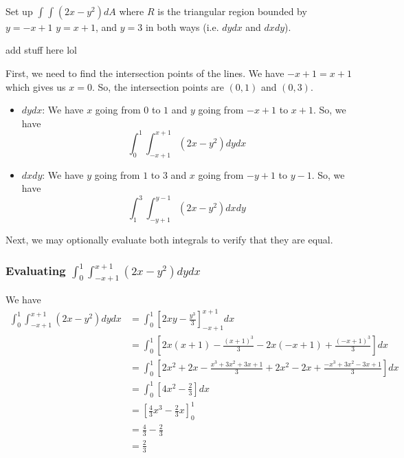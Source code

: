\documentclass{article}
\begin{document}
\begin{examplebox}
    Set up \( \int_{}^{} \int_{}^{} (2x - y^2) dA \) where \( R \) is the triangular region bounded by \( y = -x + 1 \) \( y = x + 1 \), and \( y = 3 \) in both ways (i.e. \( dydx \) and \( dxdy \)).
    \begin{illustrationbox}
        add stuff here lol
    \end{illustrationbox}
    \begin{solutionbox}
        First, we need to find the intersection points of the lines. We have \( -x + 1 = x + 1 \) which gives us \( x = 0 \). So, the intersection points are \( (0, 1) \) and \( (0, 3) \).
        \begin{itemize}
            \item \( dydx \): We have \( x \) going from \( 0 \) to \( 1 \) and \( y \) going from \( -x + 1 \) to \( x + 1 \). So, we have
                  \[ \int_{0}^{1} \int_{-x + 1}^{x + 1} (2x - y^2) dydx \]
            \item \( dxdy \): We have \( y \) going from \( 1 \) to \( 3 \) and \( x \) going from \( -y + 1 \) to \( y - 1 \). So, we have
                  \[ \int_{1}^{3} \int_{-y + 1}^{y - 1} (2x - y^2) dxdy \]
        \end{itemize}
        Next, we may optionally evaluate both integrals to verify that they are equal.
        \subsubsection*{Evaluating \( \int_{0}^{1} \int_{-x + 1}^{x + 1} (2x - y^2) dydx \)}
        We have
        \begin{align*}
            \int_{0}^{1} \int_{-x + 1}^{x + 1} (2x - y^2) dydx & = \int_{0}^{1} \left[ 2xy - \frac{y^3}{3} \right]_{-x + 1}^{x + 1} dx \\
            & = \int_{0}^{1} \left[ 2x(x + 1) - \frac{(x + 1)^3}{3} - 2x(-x + 1) + \frac{(-x + 1)^3}{3} \right] dx \\
            & = \int_{0}^{1} \left[ 2x^2 + 2x - \frac{x^3 + 3x^2 + 3x + 1}{3} + 2x^2 - 2x + \frac{-x^3 + 3x^2 - 3x + 1}{3} \right] dx \\
            & = \int_{0}^{1} \left[ 4x^2 - \frac{2}{3} \right] dx \\
            & = \left[ \frac{4}{3}x^3 - \frac{2}{3}x \right]_{0}^{1} \\
            & = \frac{4}{3} - \frac{2}{3} \\
            & = \frac{2}{3}
        \end{align*}

\end{solutionbox}
\end{examplebox}
\end{document}
